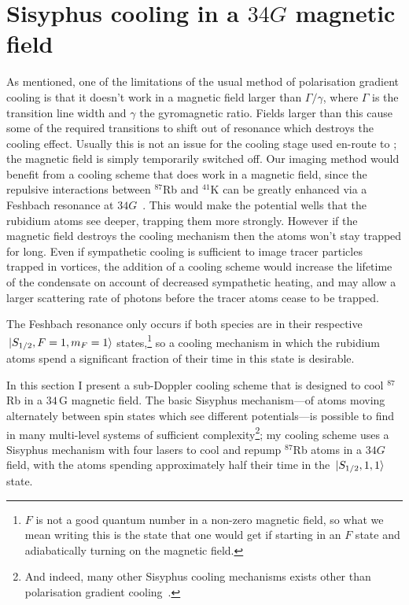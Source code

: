 \section{Sisyphus cooling in a $34\unit{G}$ magnetic field}\label{sec:laser_cooling_simulations}

As mentioned, one of the limitations of the usual method of polarisation gradient cooling is that it doesn't work in a magnetic field larger than $\Gamma/\gamma$, where $\Gamma$ is the transition line width and $\gamma$ the gyromagnetic ratio. Fields larger than this cause some of the required transitions to shift out of resonance which destroys the cooling effect. Usually this is not an issue for the cooling stage used en-route to \bec; the magnetic field is simply temporarily switched off. Our imaging method would benefit from a cooling scheme that does work in a magnetic field, since the repulsive interactions between $^{87}$Rb and $^{41}$K can be greatly enhanced via a Feshbach resonance at $34 \unit{G}$~\cite{thalhammer_double_2008}. This would make the potential wells that the rubidium atoms see deeper, trapping them more strongly. However if the magnetic field destroys the cooling mechanism then the atoms won't stay trapped for long. Even if sympathetic cooling is sufficient to image tracer particles trapped in vortices, the addition of a cooling scheme would increase the lifetime of the condensate on account of decreased sympathetic heating, and may allow a larger scattering rate of photons before the tracer atoms cease to be trapped.

The Feshbach resonance only occurs if both species are in their respective \mbox{$\ket{S_{1/2}, F=1,m_F=1}$} states,\footnote{$F$ is not a good quantum number in a non-zero magnetic field, so what we mean writing this is the state that one would get if starting in an $F$ state and adiabatically turning on the magnetic field.} so a cooling mechanism in which the rubidium atoms spend a significant fraction of their time in this state is desirable.

In this section I present a sub-Doppler cooling scheme that is designed to cool $^{87}$Rb in a $34\,$G magnetic field. The basic Sisyphus mechanism---of atoms moving alternately between spin states which see different potentials---is possible to find in many multi-level systems of sufficient complexity\footnote{And indeed, many other Sisyphus cooling mechanisms exists other than polarisation gradient cooling~\cite[p 116]{metcalf_laser_1999}.}; my cooling scheme uses a Sisyphus mechanism with four lasers to cool and repump $^{87}$Rb atoms in a $34\unit{G}$ field, with the atoms spending approximately half their time in the \mbox{$\ket{S_{1/2}, 1,1}$} state.

